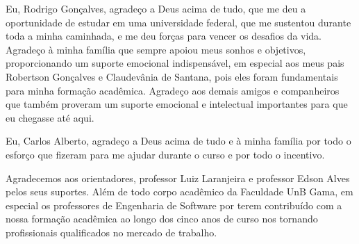 \begin{agradecimentos}
Eu, Rodrigo Gonçalves, agradeço a Deus acima de tudo, que me deu a oportunidade de estudar em uma universidade federal, que me sustentou durante toda a minha caminhada, e me deu forças para vencer os desafios da vida. Agradeço à minha família que sempre apoiou meus sonhos e objetivos, proporcionando um suporte emocional indispensável, em especial aos meus pais Robertson Gonçalves e Claudevânia de Santana, pois eles foram fundamentais para minha formação acadêmica. Agradeço aos demais amigos e companheiros que também proveram um suporte emocional e intelectual importantes para que eu chegasse até aqui.

Eu, Carlos Alberto, agradeço a Deus acima de tudo e à minha família por todo o esforço que fizeram para me ajudar durante o curso e por todo o incentivo.

Agradecemos aos orientadores, professor Luiz Laranjeira e professor Edson Alves pelos seus suportes. Além de todo corpo acadêmico da Faculdade UnB Gama, em especial os professores de Engenharia de Software por terem contribuído com a nossa formação acadêmica ao longo dos cinco anos de curso nos tornando profissionais qualificados no mercado de trabalho.
\end{agradecimentos}
